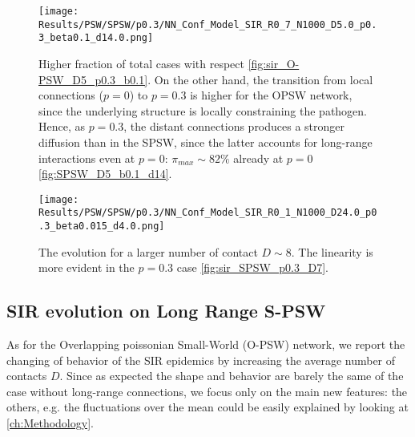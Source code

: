 \documentclass[a4paper,10pt,twoside]{book} %
\theoremstyle{definition}
\begin{document}
\begin{figure}[H]
		\texttt{[image: Results/PSW/SPSW/p0.3/NN\_Conf\_Model\_SIR\_R0\_7\_N1000\_D5.0\_p0.3\_beta0.1\_d14.0.png]}
	\caption{Higher fraction of total cases with respect \autoref{fig:sir_O-PSW_D5_p0.3_b0.1}. On the other hand, the transition from local connections ($ p = 0$) to $ p= 0.3$ is higher for the OPSW network, since the underlying structure is locally constraining the pathogen. Hence, as $ p = 0.3$, the distant connections produces a stronger diffusion than in the SPSW, since the latter accounts for long-range interactions even at $ p=0$: $ \pi_{max} \sim 82 \%$ already at $ p = 0$ \autoref{fig:SPSW_D5_b0.1_d14}.}
	\label{fig:sir_SPSW_p0.3_D7}
\end{figure}
\begin{figure}[H]
	\texttt{[image: Results/PSW/SPSW/p0.3/NN\_Conf\_Model\_SIR\_R0\_1\_N1000\_D24.0\_p0.3\_beta0.015\_d4.0.png]}
\caption{The evolution for a larger number of contact $D \sim 8$. The linearity is more evident in the $p = 0.3$ case \autoref{fig:sir_SPSW_p0.3_D7}.}
\label{fig:sir_SPSW_p0.3_D24}
\end{figure}

\clearpage
\subsection*{SIR evolution on Long Range S-PSW}
As for the Overlapping poissonian Small-World (O-PSW) network, we report the changing of behavior of the SIR epidemics by increasing the average number of contacts $D$. Since as expected the shape and behavior are barely the same of the case without long-range connections, we focus only on the main new features: the others, e.g. the fluctuations over the mean could be easily explained by looking at \autoref{ch:Methodology}.
\end{document}
